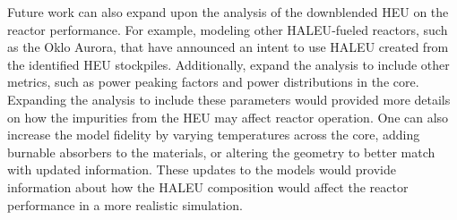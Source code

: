 Future work can also expand upon the analysis of the downblended 
\gls{HEU} on the reactor performance. For example, modeling other 
\gls{HALEU}-fueled reactors, such as the Oklo Aurora, that 
have announced an intent to use \gls{HALEU} created from the identified 
\gls{HEU} stockpiles. Additionally, expand 
the analysis to include other metrics, such as power peaking factors and 
power distributions in the core. 
Expanding the analysis to include these parameters would provided 
more details on how the impurities from the \gls{HEU} may 
affect reactor operation. One can also increase the 
model fidelity by varying temperatures across the core, 
adding burnable absorbers to the materials, or altering the 
geometry to better match with updated information. These 
updates to the models would provide information 
about how the \gls{HALEU} composition would affect the 
reactor performance in a more realistic simulation. 

